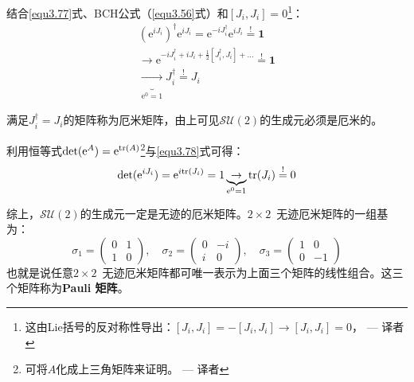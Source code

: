 结合\eqref{equ3.77}式、BCH公式（\eqref{equ3.56}式）和$[J_i, J_i] = 0$\footnote{这由Lie括号的反对称性导出：$[J_i, J_i] = -[J_i, J_i] \rightarrow [J_i, J_i] = 0$， --- 译者}：
\begin{align}
(\mathrm{e}^{i J_i})^\dag \mathrm{e}^{i J_i} = \mathrm{e}^{-i J_i^\dag} \mathrm{e}^{i J_i} \stackrel{!}{=} \mathbf{1} \nonumber \\
\rightarrow \mathrm{e}^{-i J_i^\dag + i J_i + \frac{1}{2}[J_i^\dag, J_i] + \dots } \stackrel{!}{=} \mathbf{1} \nonumber \\
\label{equ3.79}
\underbrace{\rightarrow}_{\mathrm{e}^0 = 1} J_i^\dag \stackrel{!}{=} J_i
\end{align}

满足$J_i^\dag = J_i$的矩阵称为厄米矩阵，由上可见$\mathcal{SU}(2)$的生成元必须是厄米的。

利用恒等式$\det (\mathrm{e}^A) = \mathrm{e}^{\text{tr} (A)}$\footnote{可将$A$化成上三角矩阵来证明。 --- 译者}与\eqref{equ3.78}式可得：
\begin{equation}
\label{equ3.80}
\det (\mathrm{e}^{i J_i}) = \mathrm{e}^{i \text{tr}(J_i)} = 1 \underbrace{\rightarrow}_{\mathrm{e}^0 = 1} \text{tr} (J_i) \stackrel{!}{=} 0
\end{equation}

综上，$\mathcal{SU}(2)$的生成元一定是无迹的厄米矩阵。$2 \times 2$\ 无迹厄米矩阵的一组基为：
\begin{equation}
\label{equ3.81}
\sigma_1 =	\begin{pmatrix}
				0 & 1 \\ 1 & 0
			\end{pmatrix}
, \quad
\sigma_2 = 	\begin{pmatrix}
				0 & -i \\ i & 0
			\end{pmatrix}
, \quad
\sigma_3 =	\begin{pmatrix}
				1 & 0 \\ 0 & -1
			\end{pmatrix}
\end{equation}
也就是说任意$2 \times 2$\ 无迹厄米矩阵都可唯一表示为上面三个矩阵的线性组合。这三个矩阵称为{\bf Pauli 矩阵}。

